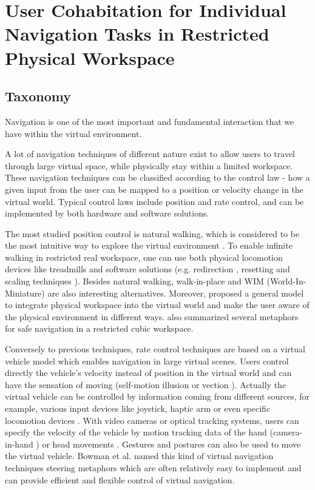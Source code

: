 \chapter{User Cohabitation for Individual Navigation Tasks in Restricted Physical Workspace}
\label{chapter:cohabitation}

\section{Taxonomy}

Navigation is one of the most important and fundamental interaction that we have within the virtual environment.

A lot of navigation techniques of different nature exist to allow users to travel through large virtual space, while physically stay within a limited workspace. These navigation techniques can be classified according to the control law - how a given input from the user can be mapped to a position or velocity change in the virtual world. Typical control laws include position and rate control, and can be implemented by both hardware and software solutions.

The most studied position control is natural walking, which is considered to be the most intuitive way to explore the virtual environment \citep{Ruddle2009BW}. To enable infinite walking in restricted real workspace, one can use both physical locomotion devices like treadmills \citep{Iwata1999Treadmill} and software solutions (e.g. redirection \citep{Peck2008RED}, resetting \citep{Williams2007ELV} and scaling techniques \cite{Interrante2007SLB}). Besides natural walking, walk-in-place \citep{Razzaque2002RWP} and WIM (World-In-Miniature) \citep{Stoakley1995VRW} are also interesting alternatives. Moreover, \citet{Fleury2010Generic} proposed a general model to integrate physical workspace into the virtual world and make the user aware of the physical environment in different ways. \citet{Cirio2012Cube} also summarized several metaphors for safe navigation in a restricted cubic workspace.

Conversely to previous techniques, rate control techniques are based on a virtual vehicle model which enables navigation in large virtual scenes. Users control directly the vehicle's velocity instead of position in the virtual world and can have the sensation of moving (self-motion illusion or vection \citep{Riecke2012Vection}). Actually the virtual vehicle can be controlled by information coming from different sources, for example, various input devices like joystick, haptic arm \citep{Martin2012HDF} or even specific locomotion devices \citep{Marchal2011JOYMAN}. With video cameras or optical tracking systems, users can specify the velocity of the vehicle by motion tracking data of the hand (camera-in-hand \citep{Ware1990EVC}) or head movements \citep{Bourdot2002HCNav}. Gestures \citep{Konrad2003GesturePlay} and postures \citep{Kapri2011Steering} can also be used to move the virtual vehicle. Bowman et al. named this kind of virtual navigation techniques steering metaphors \citep{Bowman2004UIT} which are often relatively easy to implement and can provide efficient and flexible control of virtual navigation.

